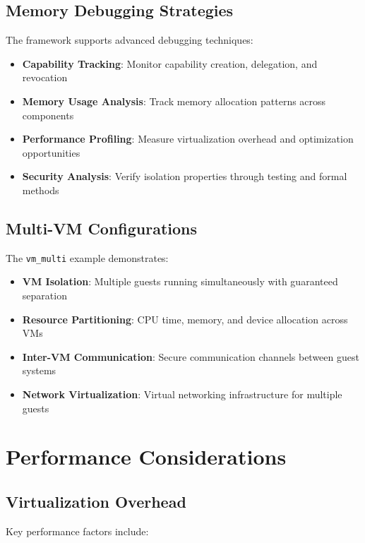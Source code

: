 \documentclass[12pt,a4paper]{article}
\begin{document}
\subsection{Memory Debugging Strategies}

The framework supports advanced debugging techniques:

\begin{itemize}
    \item \textbf{Capability Tracking}: Monitor capability creation, delegation, and revocation
    \item \textbf{Memory Usage Analysis}: Track memory allocation patterns across components
    \item \textbf{Performance Profiling}: Measure virtualization overhead and optimization opportunities
    \item \textbf{Security Analysis}: Verify isolation properties through testing and formal methods
\end{itemize}

\subsection{Multi-VM Configurations}

The \texttt{vm\_multi} example demonstrates:

\begin{itemize}
    \item \textbf{VM Isolation}: Multiple guests running simultaneously with guaranteed separation
    \item \textbf{Resource Partitioning}: CPU time, memory, and device allocation across VMs
    \item \textbf{Inter-VM Communication}: Secure communication channels between guest systems
    \item \textbf{Network Virtualization}: Virtual networking infrastructure for multiple guests
\end{itemize}

\section{Performance Considerations}

\subsection{Virtualization Overhead}

Key performance factors include:
\end{document}
